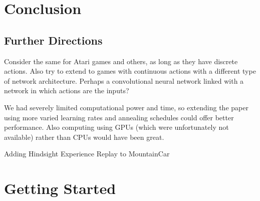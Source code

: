 \documentclass[11pt]{article}
\begin{document}
\section{Conclusion}

\subsection{Further Directions}

Consider the same for Atari games and others, as long as they have discrete actions. Also try to extend to games with continuous actions with a different type of network architecture. Perhaps a convolutional neural network linked with a network in which actions are the inputs?

We had severely limited computational power and time, so extending the paper using more varied learning rates and annealing schedules could offer better performance. Also computing using GPUs (which were unfortunately not available) rather than CPUs would have been great.

Adding Hindsight Experience Replay to MountainCar

\newpage
{}


\newpage

\appendix

\section{Getting Started}
\label{app:getting_started}
\end{document}
